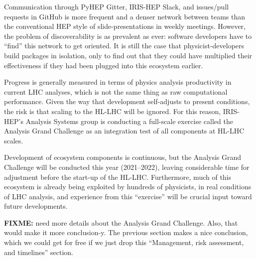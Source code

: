 \documentclass{article}
\begin{document}
Communication through PyHEP Gitter, IRIS-HEP Slack, and issues/pull requests in GitHub is more frequent and a denser network between teams than the conventional HEP style of slide-presentations in weekly meetings. However, the problem of discoverability is as prevalent as ever: software developers have to ``find'' this network to get oriented. It is still the case that physicist-developers build packages in isolation, only to find out that they could have multiplied their effectiveness if they had been plugged into this ecosystem earlier.

Progress is generally measured in terms of physics analysis productivity in current LHC analyses, which is not the same thing as raw computational performance. Given the way that development self-adjusts to present conditions, the risk is that scaling to the HL-LHC will be ignored. For this reason, IRIS-HEP's Analysis Systems group is conducting a full-scale exercise called the Analysis Grand Challenge as an integration test of all components at HL-LHC scales.

Development of ecosystem components is continuous, but the Analysis Grand Challenge will be conducted this year (2021--2022), leaving considerable time for adjustment before the start-up of the HL-LHC. Furthermore, much of this ecosystem is already being exploited by hundreds of physicists, in real conditions of LHC analysis, and experience from this ``exercise'' will be crucial input toward future developments.

{\bf FIXME:} need more details about the Analysis Grand Challenge. Also, that would make it more conclusion-y. The previous section makes a nice conclusion, which we could get for free if we just drop this ``Management, risk assessment, and timelines'' section.
\end{document}
